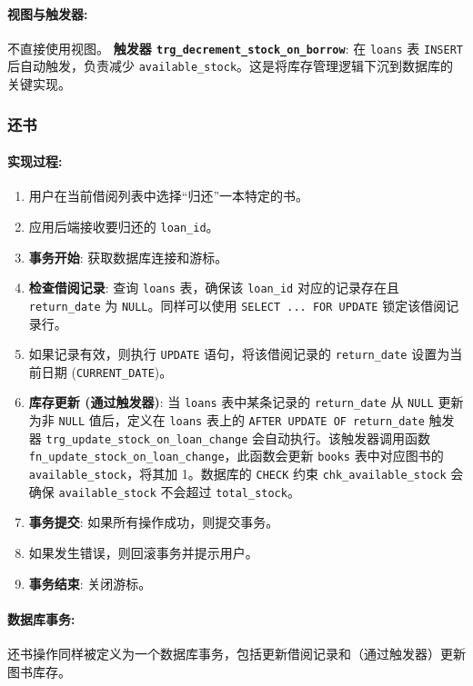 \documentclass[11pt, a4paper]{article}
\begin{document}
\paragraph{视图与触发器:}
不直接使用视图。
\textbf{触发器 \texttt{trg\_decrement\_stock\_on\_borrow}}: 在 \texttt{loans} 表 \texttt{INSERT} 后自动触发，负责减少 \texttt{available\_stock}。这是将库存管理逻辑下沉到数据库的关键实现。

\subsubsection{还书}
\paragraph{实现过程:}
\begin{enumerate}
    \item 用户在当前借阅列表中选择“归还”一本特定的书。
    \item 应用后端接收要归还的 \texttt{loan\_id}。
    \item \textbf{事务开始}: 获取数据库连接和游标。
    \item \textbf{检查借阅记录}: 查询 \texttt{loans} 表，确保该 \texttt{loan\_id} 对应的记录存在且 \texttt{return\_date} 为 \texttt{NULL}。同样可以使用 \texttt{SELECT ... FOR UPDATE} 锁定该借阅记录行。
    \item 如果记录有效，则执行 \texttt{UPDATE} 语句，将该借阅记录的 \texttt{return\_date} 设置为当前日期 (\texttt{CURRENT\_DATE})。
    \item \textbf{库存更新 (通过触发器)}: 当 \texttt{loans} 表中某条记录的 \texttt{return\_date} 从 \texttt{NULL} 更新为非 \texttt{NULL} 值后，定义在 \texttt{loans} 表上的 \texttt{AFTER UPDATE OF return\_date} 触发器 \texttt{trg\_update\_stock\_on\_loan\_change} 会自动执行。该触发器调用函数 \texttt{fn\_update\_stock\_on\_loan\_change}，此函数会更新 \texttt{books} 表中对应图书的 \texttt{available\_stock}，将其加 1。数据库的 \texttt{CHECK} 约束 \texttt{chk\_available\_stock} 会确保 \texttt{available\_stock} 不会超过 \texttt{total\_stock}。
    \item \textbf{事务提交}: 如果所有操作成功，则提交事务。
    \item 如果发生错误，则回滚事务并提示用户。
    \item \textbf{事务结束}: 关闭游标。
\end{enumerate}
\paragraph{数据库事务:}
还书操作同样被定义为一个数据库事务，包括更新借阅记录和（通过触发器）更新图书库存。
\end{document}
